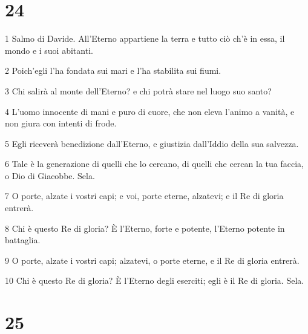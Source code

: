 \chapter{24}

\par 1 Salmo di Davide. All'Eterno appartiene la terra e tutto ciò ch'è in essa, il mondo e i suoi abitanti.
\par 2 Poich'egli l'ha fondata sui mari e l'ha stabilita sui fiumi.
\par 3 Chi salirà al monte dell'Eterno? e chi potrà stare nel luogo suo santo?
\par 4 L'uomo innocente di mani e puro di cuore, che non eleva l'animo a vanità, e non giura con intenti di frode.
\par 5 Egli riceverà benedizione dall'Eterno, e giustizia dall'Iddio della sua salvezza.
\par 6 Tale è la generazione di quelli che lo cercano, di quelli che cercan la tua faccia, o Dio di Giacobbe. Sela.
\par 7 O porte, alzate i vostri capi; e voi, porte eterne, alzatevi; e il Re di gloria entrerà.
\par 8 Chi è questo Re di gloria? È l'Eterno, forte e potente, l'Eterno potente in battaglia.
\par 9 O porte, alzate i vostri capi; alzatevi, o porte eterne, e il Re di gloria entrerà.
\par 10 Chi è questo Re di gloria? È l'Eterno degli eserciti; egli è il Re di gloria. Sela.

\chapter{25}

